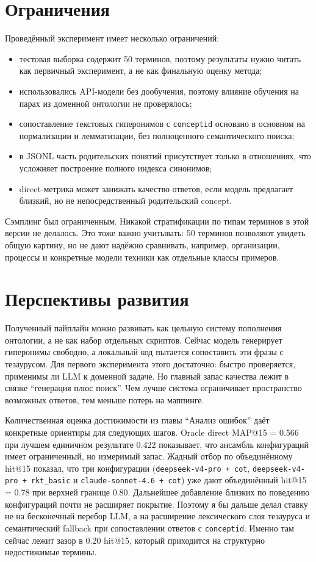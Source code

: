 \documentclass[12pt,a4paper,oneside,openany]{report}
\begin{document}
\chapter{Ограничения}

Проведённый эксперимент имеет несколько ограничений:
\begin{itemize}
  \item тестовая выборка содержит 50 терминов, поэтому результаты нужно читать как первичный эксперимент, а не как финальную оценку метода;
  \item использовались API-модели без дообучения, поэтому влияние обучения на парах из доменной онтологии не проверялось;
  \item сопоставление текстовых гиперонимов с \texttt{conceptid} основано в основном на нормализации и лемматизации, без полноценного семантического поиска;
  \item в JSONL часть родительских понятий присутствует только в отношениях, что усложняет построение полного индекса синонимов;
  \item direct-метрика может занижать качество ответов, если модель предлагает близкий, но не непосредственный родительский concept.
\end{itemize}

Сэмплинг был ограниченным. Никакой стратификации по типам терминов в этой версии не делалось. Это тоже важно учитывать: 50 терминов позволяют увидеть общую картину, но не дают надёжно сравнивать, например, организации, процессы и конкретные модели техники как отдельные классы примеров.

\chapter{Перспективы развития}

Полученный пайплайн можно развивать как цельную систему пополнения онтологии, а не как набор отдельных скриптов. Сейчас модель генерирует гиперонимы свободно, а локальный код пытается сопоставить эти фразы с тезаурусом. Для первого эксперимента этого достаточно: быстро проверяется, применимы ли LLM к доменной задаче. Но главный запас качества лежит в связке ``генерация плюс поиск''. Чем лучше система ограничивает пространство возможных ответов, тем меньше потерь на маппинге.

Количественная оценка достижимости из главы ``Анализ ошибок'' даёт конкретные ориентиры для следующих шагов. Oracle direct MAP@15 = 0.566 при лучшем единичном результате 0.422 показывает, что ансамбль конфигураций имеет ограниченный, но измеримый запас. Жадный отбор по объединённому hit@15 показал, что три конфигурации (\texttt{deepseek-v4-pro + cot}, \texttt{deepseek-v4-pro + rkt\_basic} и \texttt{claude-sonnet-4.6 + cot}) уже дают объединённый hit@15 = 0.78 при верхней границе 0.80. Дальнейшее добавление близких по поведению конфигураций почти не расширяет покрытие. Поэтому я бы дальше делал ставку не на бесконечный перебор LLM, а на расширение лексического слоя тезауруса и семантический fallback при сопоставлении ответов с \texttt{conceptid}. Именно там сейчас лежит зазор в 0.20 hit@15, который приходится на структурно недостижимые термины.
\end{document}
